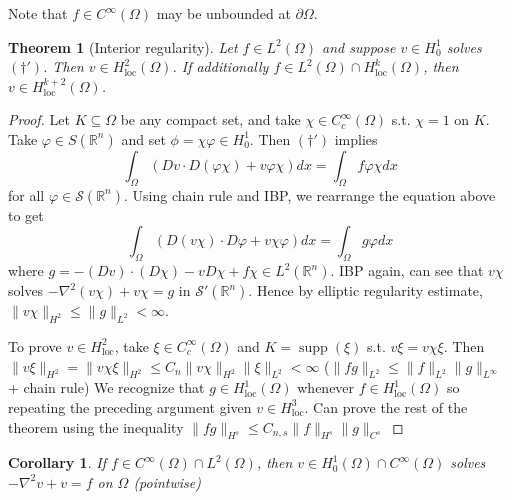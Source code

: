 \documentclass{article}
\theoremstyle{definition}
\theoremstyle{remark}
\theoremstyle{plain}
\newtheorem{thm}[defn]{Theorem}
\newtheorem{crly}[defn]{Corollary}
\newcommand{\RR}{\mathbb{R}}
\begin{document}
 Note that $f\in C^\infty(\Omega)$ may be unbounded at $\partial\Omega$.
 \begin{thm}[Interior regularity]
     Let $f\in L^2(\Omega)$ and suppose $v\in H_0^1$ solves $(\dagger')$. Then $v\in H^2_{\text{loc}}(\Omega)$. If additionally $f\in L^2(\Omega)\cap H^k_{\text{loc}}(\Omega)$, then $v\in H^{k+2}_{\text{loc}}(\Omega)$.
 \end{thm}
 \begin{proof}
 Let $K\subseteq\Omega$ be any compact set, and take $\chi\in C_c^\infty(\Omega)$ s.t. $\chi=1$ on $K$. Take $\varphi\in S(\RR^n)$ and set $\phi=\chi\varphi\in H_0^1$. Then $(\dagger')$ implies
 \[\int_\Omega(Dv\cdot D(\varphi\chi)+v\varphi\chi)dx=\int_\Omega f\varphi\chi dx\] for all $\varphi\in\mathcal S(\RR^n)$.
 Using chain rule and IBP, we rearrange the equation above to get
 \[\int_{\Omega}(D(v\chi)\cdot D\varphi+v\chi\varphi)dx=\int_\Omega g\varphi dx\]
 where $g=-(Dv)\cdot(D\chi)-v D\chi+f\chi\in L^2(\RR^n)$. IBP again, can see that $v\chi$ solves $-\nabla^2(v\chi)+v\chi=g$ in $\mathcal S'(\RR^n)$. Hence by elliptic regularity estimate, $\|v\chi\|_{H^2}\le \|g\|_{L^2}<\infty$.

 To prove $v\in H^2_{\text{loc}}$, take $\xi\in C^\infty_c(\Omega)$ and $K=\operatorname{supp}(\xi)$ s.t. $v\xi=v\chi\xi$. Then $\|v\xi\|_{H^2}=\|v\chi\xi\|_{H^2}\le C_n\|v\chi\|_{H^2}\|\xi\|_{L^2}<\infty$ ($\|fg\|_{L^2}\le \|f\|_{L^2}\|g\|_{L^\infty}$ + chain rule) We recognize that $g\in H^1_{\text{loc}}(\Omega)$ whenever $f\in H^1_{\text{loc}}(\Omega)$ so repeating the preceding argument given $v\in H^3_{\text{loc}}$. Can prove the rest of the theorem using the inequality $\|fg\|_{H^s}\le C_{n,s}\|f\|_{H^s}\|g\|_{C^s}$
 \end{proof}
 \begin{crly}
     If $f\in C^\infty(\Omega)\cap L^2(\Omega)$, then $v\in H_0^1(\Omega)\cap C^\infty(\Omega)$ solves $-\nabla^2 v+v=f$ on $\Omega$ (pointwise)
 \end{crly}
 
\end{document}

